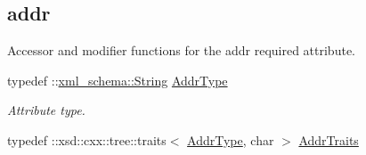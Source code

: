 \subsection*{addr}
\label{_amgrp3ef9a0d7fab5d2bcabf0978c0a35244e}
Accessor and modifier functions for the addr required attribute. \begin{DoxyCompactItemize}
\item 
\hypertarget{classopenstack_1_1xml_1_1Address_a768e0cf6818885dce0dc9df43a283011}{
typedef ::\hyperlink{namespacexml__schema_af6757b5701ccc893f3b551bd70e0c94d}{xml\_\-schema::String} \hyperlink{classopenstack_1_1xml_1_1Address_a768e0cf6818885dce0dc9df43a283011}{AddrType}}
\label{classopenstack_1_1xml_1_1Address_a768e0cf6818885dce0dc9df43a283011}

\begin{DoxyCompactList}\small\item\em Attribute type. \item\end{DoxyCompactList}\item 
\hypertarget{classopenstack_1_1xml_1_1Address_a5cde30eed2b148c6d272bf426cb6f5e5}{
typedef ::xsd::cxx::tree::traits$<$ \hyperlink{classopenstack_1_1xml_1_1Address_a768e0cf6818885dce0dc9df43a283011}{AddrType}, char $>$ \hyperlink{classopenstack_1_1xml_1_1Address_a5cde30eed2b148c6d272bf426cb6f5e5}{AddrTraits}}
\label{classopenstack_1_1xml_1_1Address_a5cde30eed2b148c6d272bf426cb6f5e5}


\end{DoxyCompactItemize}
